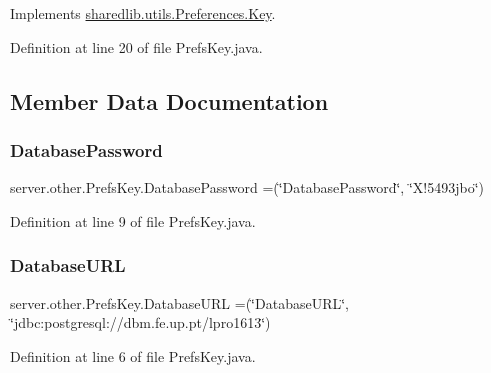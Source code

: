 Implements \hyperlink{interfacesharedlib_1_1utils_1_1_preferences_1_1_key_a966e1acb44cc01f82c1b0d80c83d185d}{sharedlib.\+utils.\+Preferences.\+Key}.



Definition at line 20 of file Prefs\+Key.\+java.



\subsection{Member Data Documentation}
\hypertarget{enumserver_1_1other_1_1_prefs_key_adb071a6655a9d117eb717dbe536cd378}{}\label{enumserver_1_1other_1_1_prefs_key_adb071a6655a9d117eb717dbe536cd378} 
\subsubsection{\texorpdfstring{Database\+Password}{DatabasePassword}}
{\footnotesize\ttfamily server.\+other.\+Prefs\+Key.\+Database\+Password =(\char`\"{}Database\+Password\char`\"{}, \char`\"{}X!5493jbo\char`\"{})}



Definition at line 9 of file Prefs\+Key.\+java.

\hypertarget{enumserver_1_1other_1_1_prefs_key_a793fc1a6571d3ee5edd1a6d092402b0a}{}\label{enumserver_1_1other_1_1_prefs_key_a793fc1a6571d3ee5edd1a6d092402b0a} 
\subsubsection{\texorpdfstring{Database\+U\+RL}{DatabaseURL}}
{\footnotesize\ttfamily server.\+other.\+Prefs\+Key.\+Database\+U\+RL =(\char`\"{}Database\+U\+RL\char`\"{}, \char`\"{}jdbc\+:postgresql\+://dbm.\+fe.\+up.\+pt/lpro1613\char`\"{})}



Definition at line 6 of file Prefs\+Key.\+java.

\hypertarget{enumserver_1_1other_1_1_prefs_key_ae50ad92fb11fa5b0ff6f0f5b980d81d0}{}\label{enumserver_1_1other_1_1_prefs_key_ae50ad92fb11fa5b0ff6f0f5b980d81d0} 
